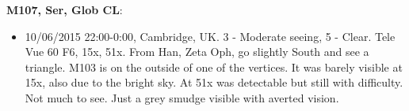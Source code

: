 {\bf M107, Ser, Glob CL}:
\begin{itemize}
\item 10/06/2015 22:00-0:00, Cambridge, UK. 3 - Moderate seeing, 5 - Clear. Tele Vue 60 F6, 15x, 51x. From Han, Zeta Oph, go slightly South and see a triangle. M103 is on the outside of one of the vertices. It was barely visible at 15x, also due to the bright sky. At 51x was detectable but still with difficulty. Not much to see. Just a grey smudge visible with averted vision.
\end{itemize}
